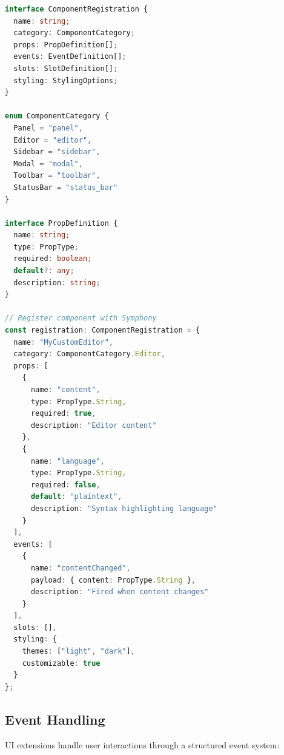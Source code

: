 \begin{lstlisting}[language=TypeScript,caption={Component Registration}]
interface ComponentRegistration {
  name: string;
  category: ComponentCategory;
  props: PropDefinition[];
  events: EventDefinition[];
  slots: SlotDefinition[];
  styling: StylingOptions;
}

enum ComponentCategory {
  Panel = "panel",
  Editor = "editor",
  Sidebar = "sidebar",
  Modal = "modal",
  Toolbar = "toolbar",
  StatusBar = "status_bar"
}

interface PropDefinition {
  name: string;
  type: PropType;
  required: boolean;
  default?: any;
  description: string;
}

// Register component with Symphony
const registration: ComponentRegistration = {
  name: "MyCustomEditor",
  category: ComponentCategory.Editor,
  props: [
    {
      name: "content",
      type: PropType.String,
      required: true,
      description: "Editor content"
    },
    {
      name: "language",
      type: PropType.String,
      required: false,
      default: "plaintext",
      description: "Syntax highlighting language"
    }
  ],
  events: [
    {
      name: "contentChanged",
      payload: { content: PropType.String },
      description: "Fired when content changes"
    }
  ],
  slots: [],
  styling: {
    themes: ["light", "dark"],
    customizable: true
  }
};
\end{lstlisting}

\subsection*{Event Handling}

UI extensions handle user interactions through a structured event system:

